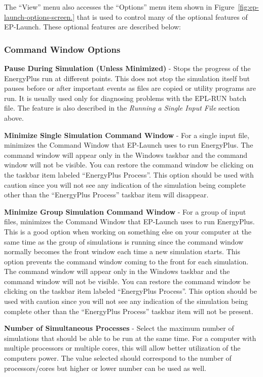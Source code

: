 The ``View'' menu also accesses the ``Options'' menu item shown in Figure~\ref{fig:ep-launch-options-screen.} that is used to control many of the optional features of EP-Launch. These optional features are described below:

\subsubsection{Command Window Options}\label{command-window-options}

\textbf{Pause During Simulation (Unless Minimized)} - Stops the progress of the EnergyPlus run at different points. This does not stop the simulation itself but pauses before or after important events as files are copied or utility programs are run. It is usually used only for diagnosing problems with the EPL-RUN batch file. The feature is also described in the \emph{Running a Single Input File} section above.

\textbf{Minimize Single Simulation Command Window} - For a single input file, minimizes the Command Window that EP-Launch uses to run EnergyPlus. The command window will appear only in the Windows taskbar and the command window will not be visible. You can restore the command window be clicking on the taskbar item labeled ``EnergyPlus Process''. This option should be used with caution since you will not see any indication of the simulation being complete other than the ``EnergyPlus Process'' taskbar item will disappear.

\textbf{Minimize Group Simulation Command Window} - For a group of input files, minimizes the Command Window that EP-Launch uses to run EnergyPlus. This is a good option when working on something else on your computer at the same time as the group of simulations is running since the command window normally becomes the front window each time a new simulation starts. This option prevents the command window coming to the front for each simulation. The command window will appear only in the Windows taskbar and the command window will not be visible. You can restore the command window be clicking on the taskbar item labeled ``EnergyPlus Process''. This option should be used with caution since you will not see any indication of the simulation being complete other than the ``EnergyPlus Process'' taskbar item will not be present.

\textbf{Number of Simultaneous Processes} - Select the maximum number of simulations that should be able to be run at the same time. For a computer with multiple processors or multiple cores, this will allow better utilization of the computers power. The value selected should correspond to the number of processors/cores but higher or lower number can be used as well.

